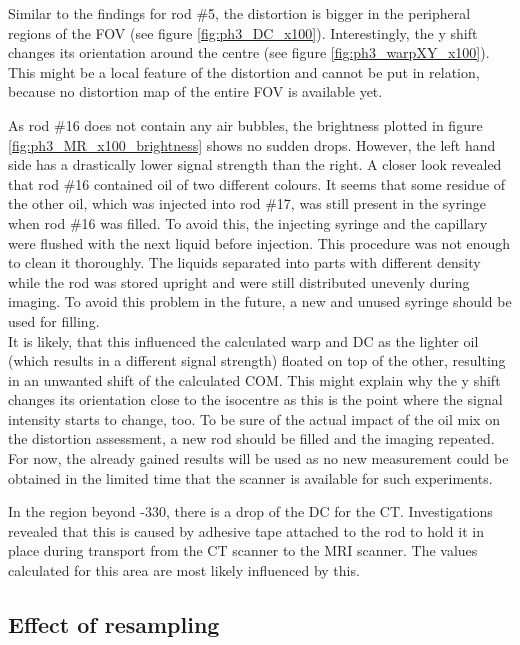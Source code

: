 Similar to the findings for rod \#5, the distortion is bigger in the peripheral regions of the FOV (see figure \ref{fig:ph3_DC_x100}).
Interestingly, the y shift changes its orientation around the centre (see figure \ref{fig:ph3_warpXY_x100}).
This might be a local feature of the distortion and cannot be put in relation, because no distortion map of the entire FOV is available yet.

As rod \#16 does not contain any air bubbles, the brightness plotted in figure \ref{fig:ph3_MR_x100_brightness} shows no sudden drops.
However, the left hand side has a drastically lower signal strength than the right.
A closer look revealed that rod \#16 contained oil of two different colours.
It seems that some residue of the other oil, which was injected into rod \#17, was still present in the syringe when rod \#16 was filled.
To avoid this, the injecting syringe and the capillary were flushed with the next liquid before injection.
This procedure was not enough to clean it thoroughly.
The liquids separated into parts with different density while the rod was stored upright and were still distributed unevenly during imaging.
To avoid this problem in the future, a new and unused syringe should be used for filling.\\

It is likely, that this influenced the calculated warp and DC as the lighter oil (which results in a different signal strength) floated on top of the other, resulting in an unwanted shift of the calculated COM.
This might explain why the y shift changes its orientation close to the isocentre as this is the point where the signal intensity starts to change, too.
To be sure of the actual impact of the oil mix on the distortion assessment, a new rod should be filled and the imaging repeated.
For now, the already gained results will be used as no new measurement could be obtained in the limited time that the scanner is available for such experiments.


In the region beyond -330, there is a drop of the DC for the CT.
Investigations revealed that this is caused by adhesive tape attached to the rod to hold it in place during transport from the CT scanner to the MRI scanner.
The values calculated for this area are most likely influenced by this.


\subsection{Effect of resampling}


